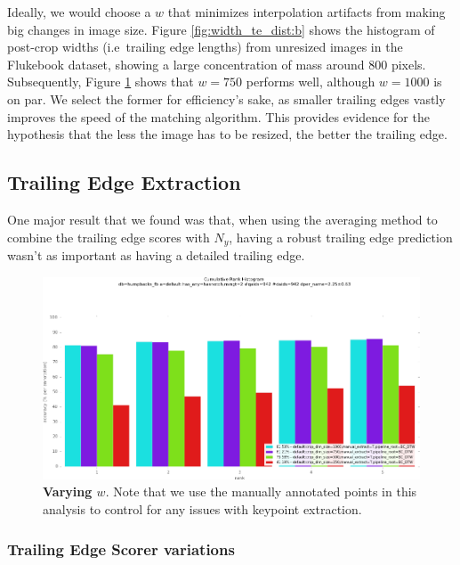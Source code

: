 
Ideally, we would choose a $w$ that minimizes interpolation artifacts from making big changes in image size.
Figure \ref{fig:width_te_dist:b} shows the histogram of post-crop widths (i.e\ trailing edge lengths) from unresized images in the Flukebook dataset, showing a large concentration of mass around 800 pixels. 
Subsequently, Figure \ref{fig:vary_crop_size} shows that $w = 750$ performs well, although $w = 1000$ is on par.
We select the former for efficiency's sake, as smaller trailing edges vastly improves the speed of the matching algorithm.
This provides evidence for the hypothesis that the less the image has to be resized, the better the trailing edge.

\subsection{Trailing Edge Extraction}

One major result that we found was that, when using the averaging method to combine the trailing edge scores with $N_y$, having a robust trailing edge prediction wasn't as important as having a detailed trailing edge.

\begin{figure}[t]%
\centering
\includegraphics[width=1\textwidth]{../images/results/vary_crop_size.png}
\caption{\textbf{Varying $w$}. Note that we use the manually annotated points in this analysis to control for any issues with keypoint extraction.}
\label{fig:vary_crop_size}
\end{figure}


\subsubsection{Trailing Edge Scorer variations}

